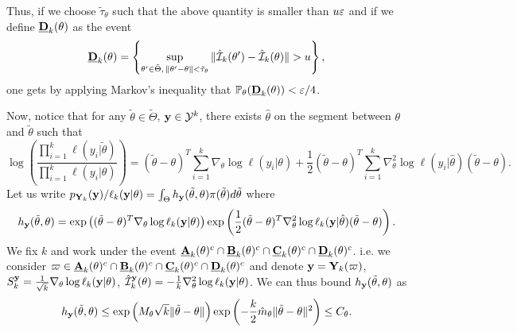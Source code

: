 \begin{proofb}
\begin{enumerate}
    
    Thus, {if we choose $\tilde\tau_\theta$ such that the above quantity is smaller than %
    $u\varepsilon$ and if we define $\underline{\mathbf{D}}_k(\theta)$ as the event}
    \begin{equation}
        \underline{\mbf D}_k(\theta)=\left\{\sup_{\theta'\in\tilde\Theta,\,\|\theta'-\theta\|<\tilde\tau_\theta}\|\hat\cI_k(\theta')-\hat\cI_k(\theta)\|>u \right\}, %
    \end{equation}
    one gets by applying Markov's inequality that $\mathbb{P}_\theta(\underline{\mathbf{D}}_k(\theta))<\varepsilon/4$.
    \end{enumerate}

    Now, notice that for any $\tilde\theta\in\tilde\Theta$, $\mathbf{y}\in\mathcal{Y}^k$, there exists $\hat\theta$ on the segment between $\theta$ and $\tilde\theta$ such that
    \begin{equation}\label{eq:DLlogfraclik}
        \log\left(\frac{\prod_{i=1}^k \ell(y_i|\tilde\theta)}{\prod_{i=1}^k \ell(y_i|\theta)}\right) = (\tilde\theta-\theta)^T\sum_{i=1}^k\nabla_\theta\log \ell(y_i|\theta) +\frac{1}{2}(\tilde\theta-\theta)^T\sum_{i=1}^k\nabla_\theta^2\log \ell(y_i|\hat\theta)(\tilde\theta-\theta).
    \end{equation}
    Let us write %
    $p_{\mathbf{Y}_k}(\mathbf{y})/\ell_k(\mathbf{y}|\theta) = \int_\Theta h_{\mathbf{y}}(\tilde\theta,\theta)\pi(\tilde\theta)d\tilde\theta$ where
    \begin{equation}\label{eq:hydef}
        h_{\mathbf{y}}(\tilde\theta,\theta) = \exp\left((\tilde\theta-\theta)^T\nabla_\theta\log\ell_k(\mathbf{y}|\theta)\right)  \exp \left( \frac{1}{2}(\tilde\theta-\theta)^T\nabla^2_\theta\log\ell_k(\mathbf{y}|\hat\theta)(\tilde\theta-\theta) \right).
    \end{equation}
    We fix $k$ and work under the event $\underline{\mathbf{A}}_k(\theta)^c\cap \underline{\mathbf{B}}_k(\theta)^c\cap \underline{\mathbf{C}}_k(\theta)^c\cap \underline{\mathbf{D}}_k(\theta)^c$. i.e. we %
    consider $\varpi\in \underline{\mathbf{A}}_k(\theta)^c\cap \underline{\mathbf{B}}_k(\theta)^c\cap \underline{\mathbf{C}}_k(\theta)^c\cap \underline{\mathbf{D}}_k(\theta)^c$ and denote $\mathbf{y} = \mathbf{Y}_k(\varpi)$, $ S_k^{\mathbf{y}}=\frac{1}{\sqrt{k}}\nabla_\theta\log\ell_k(\mathbf{y}|\theta)$, $\hat{\mathcal{I}}_k^{\mathbf{y}}(\theta) =-\frac{1}{k}\nabla^2_\theta\log\ell_k(\mathbf{y}|\theta) $.
    We can thus bound $h_{\mathbf{y}}(\tilde\theta,\theta)$  as
    \begin{equation}\label{eq:inegh}
        h_{\mathbf{y}}(\tilde\theta,\theta) \leq\exp\left( M_\theta\sqrt{k}\|\tilde\theta-\theta\| \right)\exp\left( -\frac{k}{2}\hat m_\theta\|\tilde\theta-\theta\|^2 \right)\leq C_\theta.
    \end{equation}
    

\end{proofb}
